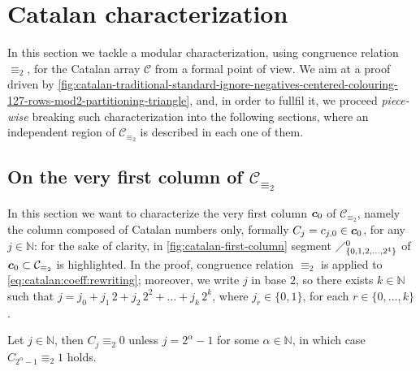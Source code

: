 
\section{Catalan characterization}
\label{sec:catalan:characterization}

In this section we tackle a modular characterization, using congruence relation
$\equiv_{2}$, for the Catalan array $\mathcal{C}$ from a formal point of view.
We aim at a proof driven by
\autoref{fig:catalan-traditional-standard-ignore-negatives-centered-colouring-127-rows-mod2-partitioning-triangle},
and, in order to fullfil it, we proceed \emph{piece-wise} breaking such
characterization into the following sections, where an independent region of
$\mathcal{C}_{\equiv_{2}}$ is described in each one of them.


\subsection{On the very first column of $\mathcal{C}_{\equiv_{2}}$}

In this section we want to characterize the very first column $\boldsymbol{c}_{0}$
of $\mathcal{C}_{\equiv_{2}}$, namely the column composed of Catalan numbers only,
formally $C_{j}=c_{j,0}\in\boldsymbol{c}_{0}$, for any $j\in\mathbb{N}$:
for the sake of clarity, in \autoref{fig:catalan-first-column} segment
$\diagup_{\lbrace 0,1,2,\ldots,2^{4}\rbrace}^{0}$ of $\boldsymbol{c}_{0}\subset\mathcal{C}_{\equiv_{2}}$
is highlighted. In the proof, congruence relation $\equiv_{2}$ is applied to \autoref{eq:catalan:coeff:rewriting};
moreover, we write $j$ in base $2$, so there exists $k\in\mathbb{N}$ such that
$j=j_{0} + j_{1}\,2 + j_{2}\,2^{2} + \ldots + j_{k}\,2^{k}$, where
$j_{r}\in\lbrace0,1\rbrace$, for each $r\in\lbrace0,\ldots,k\rbrace$.

\begin{theorem}
    Let $j\in\mathbb{N}$, then $C_{j} \equiv_{2} 0$ unless $j=2^{\alpha}-1$ for some $\alpha\in\mathbb{N}$,
    in which case $C_{2^{\alpha}-1} \equiv_{2} 1$ holds.
\end{theorem}

